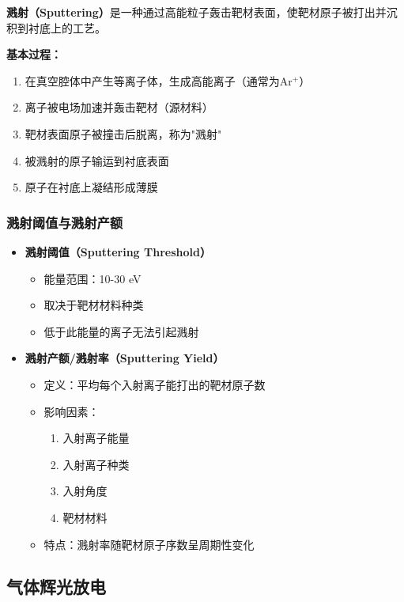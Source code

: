 \documentclass[UTF8,12pt,a4paper]{ctexart}
\begin{document}
\textbf{溅射（Sputtering）}是一种通过高能粒子轰击靶材表面，使靶材原子被打出并沉积到衬底上的工艺。

\textbf{基本过程：}
\begin{enumerate}
    \item 在真空腔体中产生等离子体，生成高能离子（通常为Ar$^+$）
    \item 离子被电场加速并轰击靶材（源材料）
    \item 靶材表面原子被撞击后脱离，称为"溅射"
    \item 被溅射的原子输运到衬底表面
    \item 原子在衬底上凝结形成薄膜
\end{enumerate}

\subsubsection{溅射阈值与溅射产额}

\begin{itemize}
    \item \textbf{溅射阈值（Sputtering Threshold）}
    \begin{itemize}
        \item 能量范围：10-30 eV
        \item 取决于靶材材料种类
        \item 低于此能量的离子无法引起溅射
    \end{itemize}
    
    \item \textbf{溅射产额/溅射率（Sputtering Yield）}
    \begin{itemize}
        \item 定义：平均每个入射离子能打出的靶材原子数
        \item 影响因素：
        \begin{enumerate}
            \item 入射离子能量
            \item 入射离子种类
            \item 入射角度
            \item 靶材材料
        \end{enumerate}
        \item 特点：溅射率随靶材原子序数呈周期性变化
    \end{itemize}
\end{itemize}

\subsection{气体辉光放电}
\end{document}
